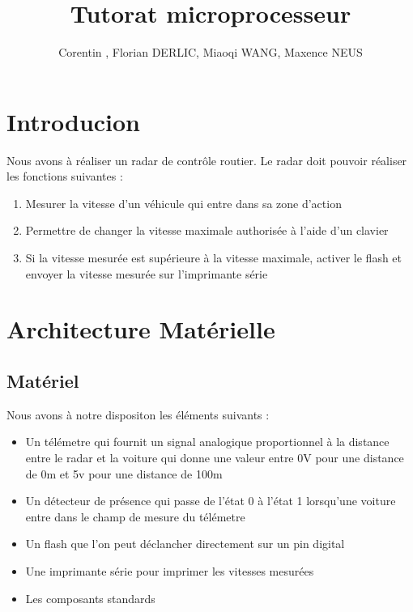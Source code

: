 \documentclass[a4paper, 12pt]{article}
\begin{document}
	\title{Tutorat microprocesseur}
	\author{Corentin , Florian DERLIC, Miaoqi WANG, Maxence NEUS}
	\maketitle
	
	\newpage
	\tableofcontents
	\newpage
	
	\section{Introducion}
		Nous avons à réaliser un radar de contrôle routier.
		Le radar doit pouvoir réaliser les fonctions suivantes :
		\begin{enumerate}
			\item Mesurer la vitesse d'un véhicule qui entre dans sa zone d'action
			\item Permettre de changer la vitesse maximale authorisée à l'aide d'un clavier
			\item Si la vitesse mesurée est supérieure à la vitesse maximale, activer le flash et envoyer la vitesse mesurée sur l'imprimante série
		\end{enumerate}
	\newpage
	\section{Architecture Matérielle}
		\subsection{Matériel}
		Nous avons à notre dispositon les éléments suivants :
		\begin{itemize}
			\item Un télémetre qui fournit un signal analogique proportionnel à la distance entre le radar et la voiture
			qui donne une valeur entre 0V pour une distance de 0m et 5v pour une distance de 100m
			\item Un détecteur de présence qui passe de l'état 0 à l'état 1 lorsqu'une voiture entre dans le champ de mesure du télémetre
			\item Un flash que l'on peut déclancher directement sur un pin digital
			\item Une imprimante série pour imprimer les vitesses mesurées
			\item Les composants standards
		\end{itemize}	
\end{document}
